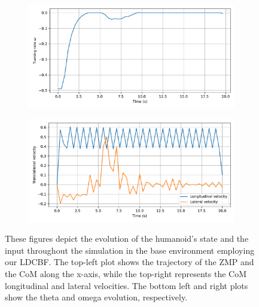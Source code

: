 \begin{figure}[H]
\begin{subfigure}{0.45\linewidth}
    \end{subfigure}
    \begin{subfigure}{0.45\linewidth}
        \centering
        \includegraphics[width=\linewidth]{figures/Simulations/sim1circles/evolution_3.pdf}
    \end{subfigure}
    \hfill
    \begin{subfigure}{0.45\linewidth}
        \centering
        \includegraphics[width=\linewidth]{figures/Simulations/sim1circles/evolution_1.pdf}
    \end{subfigure}
    \caption{These figures depict the evolution of the humanoid's state and the input throughout the simulation in the base environment employing our LDCBF. The top-left plot shows the trajectory of the ZMP and the CoM along the x-axis, while the top-right represents the CoM longitudinal and lateral velocities. The bottom left and right plots show the theta and omega evolution, respectively.}
    \label{fig:sim1_evol}
\end{figure}

